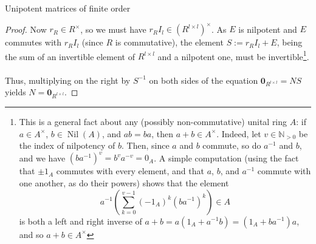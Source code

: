 \begin{appendixitem}{Unipotent matrices of finite order}
\begin{proof}
        Now \( r_{R} \in R^{\times} \), so we must have \( r_{R} I_{l} \in \left(R^{l\times l}\right)^{\times} \). As \( E \) is nilpotent and \( E \) commutes with \( r_{R} I_{l} \) (since \( R \) is commutative), the element \( S := r_{R} I_{l} + E \), being the sum of an invertible element of \( R^{l\times l} \) and a nilpotent one, must be invertible\footnote{This is a general fact about any (possibly non-commutative) unital ring \( A \): if \( a \in A^{\times} \), \( b \in \operatorname{Nil}\left(A\right) \), and \( ab = ba \), then \( a + b \in A^{\times} \). Indeed, let \( v \in \mathbb{N}_{>0} \) be the index of nilpotency of \( b \). Then, since \( a \) and \( b \) commute, so do \( a^{-1} \) and \( b \), and we have \( \left(ba^{-1}\right)^v = b^va^{-v} = 0_{A} \). A simple computation (using the fact that \( \pm 1_{A} \) commutes with every element, and that \( a \), \( b \), and \( a^{-1} \) commute with one another, as do their powers) shows that the element
        \[
            a^{-1} \left( \sum_{k=0}^{v-1} \left(-1_{A}\right)^k \left(b a^{-1}\right)^k \right)\in A
        \]
        is both a left and right inverse of \( a + b = a \left(1_{A} + a^{-1} b\right)=\left(1_{A} + ba^{-1}\right)a \), and so \( a+b\in A^{\times} \)}.
        \\\\
        Thus, multiplying on the right by \( S^{-1} \) on both sides of the equation \( \mathbf{0}_{R^{l\times l}} = N S \) yields \( N = \mathbf{0}_{R^{l\times l}} \).
    \end{proof}
\end{appendixitem}
